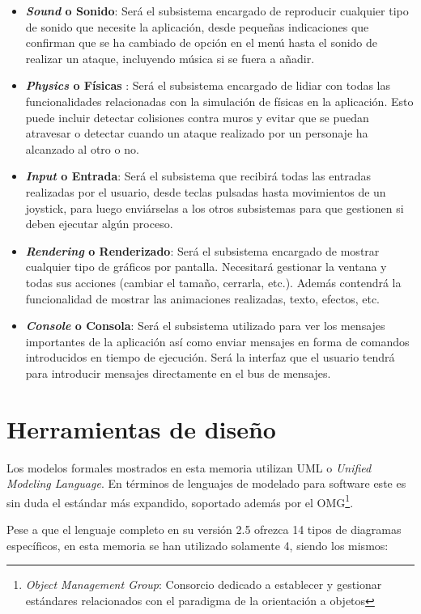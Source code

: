 \begin{itemize}
	\item \textbf{\textit{Sound} o Sonido}: Será el subsistema encargado de reproducir cualquier tipo de sonido que necesite la aplicación, desde pequeñas indicaciones que confirman que se ha cambiado de opción en el menú hasta el sonido de realizar un ataque, incluyendo música si se fuera a añadir.
	\item \textbf{\textit{Physics} o Físicas }: Será el subsistema encargado de lidiar con todas las funcionalidades relacionadas con la simulación de físicas en la aplicación. Esto puede incluir detectar colisiones contra muros y evitar que se puedan atravesar o detectar cuando un ataque realizado por un personaje ha alcanzado al otro o no.
	\item \textbf{\textit{Input} o Entrada}: Será el subsistema que recibirá todas las entradas realizadas por el usuario, desde teclas pulsadas hasta movimientos de un joystick, para luego enviárselas a los otros subsistemas para que gestionen si deben ejecutar algún proceso.
	\item \textbf{\textit{Rendering} o Renderizado}: Será el subsistema encargado de mostrar cualquier tipo de gráficos por pantalla. Necesitará gestionar la ventana y todas sus acciones (cambiar el tamaño, cerrarla, etc.). Además contendrá la funcionalidad de mostrar las animaciones realizadas, texto, efectos, etc.
	\item \textbf{\textit{Console} o Consola}: Será el subsistema utilizado para ver los mensajes importantes de la aplicación así como enviar mensajes en forma de comandos introducidos en tiempo de ejecución. Será la interfaz que el usuario tendrá para introducir mensajes directamente en el bus de mensajes.
\end{itemize}
  

\section{Herramientas de diseño}

Los modelos formales mostrados en esta memoria utilizan UML o \textit{Unified Modeling Language}. En términos de lenguajes de modelado para software este es sin duda el estándar más expandido, soportado además por el OMG\footnote{\textit{Object Management Group}: Consorcio dedicado a establecer y gestionar estándares relacionados con el paradigma de la orientación a objetos}.

\bigskip

Pese a que el lenguaje completo en su versión 2.5 ofrezca 14 tipos de diagramas específicos, en esta memoria se han utilizado solamente 4, siendo los mismos:

